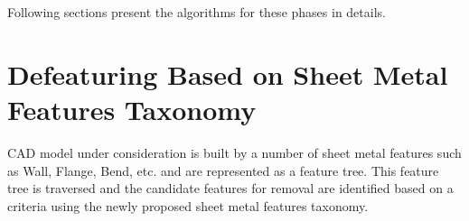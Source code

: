 
Following sections present the algorithms for these phases in details.


\section{Defeaturing Based on Sheet Metal Features \mbox{Taxonomy}}\label{sec:defeaturing:phase1}

CAD model under consideration is built by a number of sheet metal features such as Wall, Flange, Bend, etc. and are represented as a feature tree. This feature tree is traversed and the candidate features for removal are identified based on a criteria using the newly proposed sheet metal features taxonomy.

